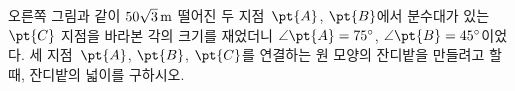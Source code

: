 \noindent\begin{minipage}[t]{0.58\linewidth}\vspace{0pt}\raggedright 오른쪽 그림과 같이 $50\sqrt{3}\mkern3mu \mathrm{m}$ 떨어진 두 지점~$\pt{A}$, $\pt{B}$에서 분수대가 있는 $\pt{C}$ 지점을 바라본 각의 크기를 재었더니 $\angle\pt{A}=75^\circ$, $\angle\pt{B}=45^\circ$이었다. 세 지점~$\pt{A}$, $\pt{B}$, $\pt{C}$를 연결하는 원 모양의 잔디밭을 만들려고 할 때, 잔디밭의 넓이를 구하시오.\end{minipage}\hfill\begin{minipage}[t]{0.4\linewidth}\vspace{0pt}\centering \resizebox{\ifdim\width>\linewidth\linewidth\else\width\fi}{!}{}\end{minipage}\par

